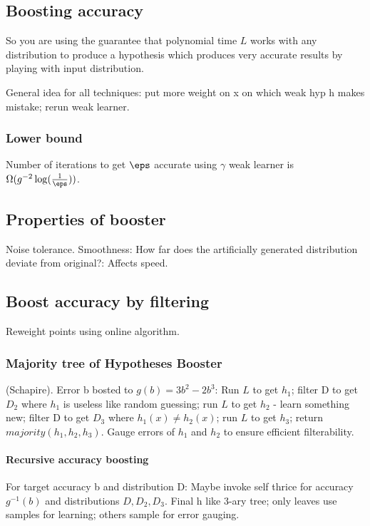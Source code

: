 \documentclass[oneside, article]{memoir}
\begin{document}
\subsection{Boosting accuracy}
So you are using the guarantee that polynomial time $L$ works with any distribution to produce a hypothesis which produces very accurate results by playing with input distribution.

General idea for all techniques: put more weight on x on which weak hyp h makes mistake; rerun weak learner.

\subsubsection{Lower bound}
Number of iterations to get $\eps$ accurate using $\gamma$ weak learner is $\Omega(g^{-2}\log (\frac{1}{\eps}))$.

\subsection{Properties of booster}
Noise tolerance. Smoothness: How far does the artificially generated distribution deviate from original?: Affects speed.

\subsection{Boost accuracy by filtering}
Reweight points using online algorithm.

\subsubsection{Majority tree of Hypotheses Booster}
(Schapire). Error b bosted to $g(b) = 3b^{2}-2b^{3}$: Run $L$ to get $h_{1}$; filter D to get $D_{2}$ where $h_{1}$ is useless like random guessing; run $L$ to get $h_{2}$ - learn something new; filter D to get $D_{3}$ where $h_{1}(x) \neq h_{2}(x)$; run $L$ to get $h_{3}$; return $majority(h_{1},h_{2},h_{3})$. Gauge errors of $h_{1}$ and $h_{2}$ to ensure efficient filterability.

\paragraph*{Recursive accuracy boosting}
For target accuracy b and distribution D: Maybe invoke self thrice for accuracy $g^{-1}(b)$ and distributions $D, D_{2}, D_{3}$. Final h like 3-ary tree; only leaves use samples for learning; others sample for error gauging.
\end{document}
